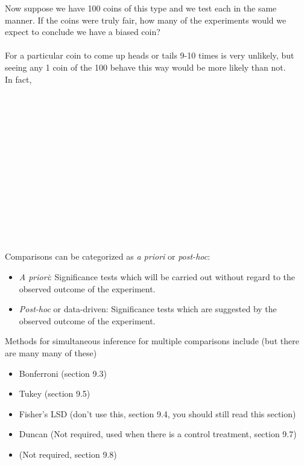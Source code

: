 Now suppose we have 100 coins of this type and we test each in the same manner.  If the coins were truly fair, how many of the experiments would we expect to conclude we have a biased coin?\\~\\
For a particular coin to come up heads or tails 9-10 times is very unlikely, but seeing any 1 coin of the 100 behave this way would be more likely than not.\\
In fact, \\~\\~\\~\\~\\~\\~\\~\\~\\~\\~\\~\\
\\~\\~\\
\color{black}
Comparisons can be categorized as {\em a priori} or {\em post-hoc}:
\begin{itemize}
\item {\em A priori}: Significance tests which will be carried out without regard to the observed outcome of the experiment.
\item {\em Post-hoc} or data-driven: Significance tests which are suggested by the observed outcome of the experiment.
\end{itemize}

Methods for simultaneous inference for multiple comparisons include (but there are many many of these)
\begin{itemize}
\item Bonferroni (section 9.3)
\item Tukey (section 9.5)
\item Fisher's LSD (don't use this, section 9.4, you should still read this section)
\item Duncan (Not required, used when there is a control treatment, section 9.7)
\item \chef (Not required, section 9.8)
\end{itemize}

